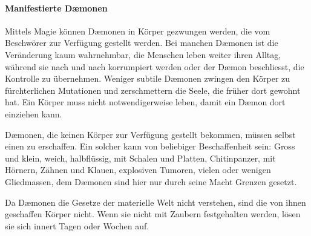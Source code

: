 \documentclass[10pt,twoside,twocolumn,openany]{book}
\begin{document}
\paragraph{Manifestierte D\ae monen}
Mittels Magie können D\ae monen in Körper gezwungen werden, die vom Beschwörer zur Verfügung gestellt werden. Bei manchen D\ae monen ist die Veränderung kaum wahrnehmbar, die Menschen leben weiter ihren Alltag, während sie nach und nach korrumpiert werden oder der D\ae mon beschliesst, die Kontrolle zu übernehmen. Weniger subtile D\ae monen zwingen den Körper zu fürchterlichen Mutationen und zerschmettern die Seele, die früher dort gewohnt hat. Ein Körper muss nicht notwendigerweise leben, damit ein D\ae mon dort einziehen kann.

D\ae monen, die keinen Körper zur Verfügung gestellt bekommen, müssen selbst einen zu erschaffen. Ein solcher kann von beliebiger Beschaffenheit sein: Gross und klein, weich, halbflüssig, mit Schalen und Platten, Chitinpanzer, mit Hörnern, Zähnen und Klauen, explosiven Tumoren, vielen oder wenigen Gliedmassen, dem D\ae monen sind hier nur durch seine Macht Grenzen gesetzt.

Da D\ae monen die Gesetze der materielle Welt nicht verstehen, sind die von ihnen geschaffen Körper nicht. Wenn sie nicht mit Zaubern festgehalten werden, lösen sie sich innert Tagen oder Wochen auf.
\end{document}
